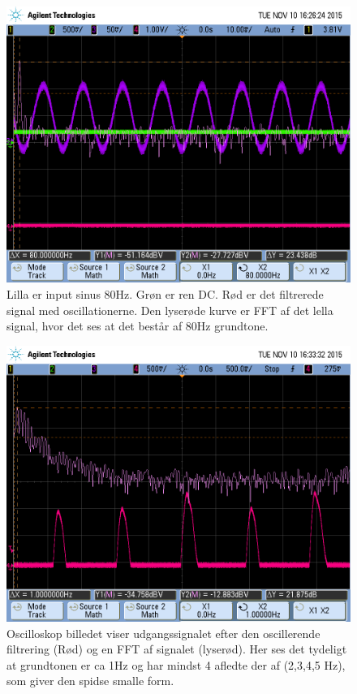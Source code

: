 \begin{figure}[H]
	\includegraphics[width=\textwidth]{billeder/scope_8.png}
	\caption{Lilla er input sinus 80Hz. Grøn er ren DC. Rød er det 	filtrerede signal med oscillationerne. Den lyserøde kurve er FFT af det lella signal, hvor det ses at det består af 80Hz grundtone.}\label{fig:filtertwo}
\end{figure}
\newpage

\begin{figure}[H]
	\includegraphics[width=\textwidth]{billeder/scope_10.png}
	\caption{Oscilloskop billedet viser udgangssignalet efter den oscillerende 	filtrering (Rød) og en FFT af signalet (lyserød). Her ses det tydeligt at grundtonen er ca 1Hz og har mindst 4 afledte der af 	(2,3,4,5 Hz), som giver den spidse smalle form.}\label{fig:filterthree}
\end{figure}

